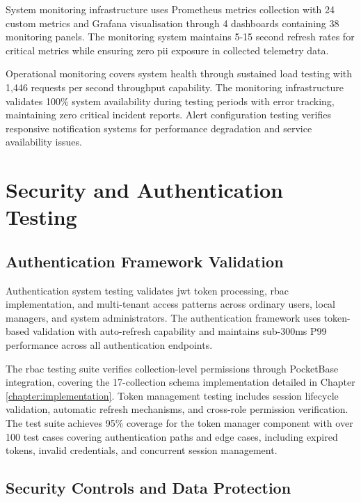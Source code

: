 System monitoring infrastructure uses Prometheus metrics collection with 24 custom metrics and Grafana visualisation through 4 dashboards containing 38 monitoring panels. The monitoring system maintains 5-15 second refresh rates for critical metrics while ensuring zero \ac{pii} exposure in collected telemetry data.

Operational monitoring covers system health through sustained load testing with 1,446 requests per second throughput capability. The monitoring infrastructure validates 100\% system availability during testing periods with error tracking, maintaining zero critical incident reports. Alert configuration testing verifies responsive notification systems for performance degradation and service availability issues.


\section{Security and Authentication Testing} \label{section:security_testing}

\subsection{Authentication Framework Validation} \label{subsection:authentication_validation}

Authentication system testing validates \ac{jwt} token processing, \ac{rbac} implementation, and multi-tenant access patterns across ordinary users, local managers, and system administrators. The authentication framework uses token-based validation with auto-refresh capability and maintains sub-300ms P99 performance across all authentication endpoints.

The \ac{rbac} testing suite verifies collection-level permissions through PocketBase integration, covering the 17-collection schema implementation detailed in Chapter \ref{chapter:implementation}. Token management testing includes session lifecycle validation, automatic refresh mechanisms, and cross-role permission verification. The test suite achieves 95\% coverage for the token manager component with over 100 test cases covering authentication paths and edge cases, including expired tokens, invalid credentials, and concurrent session management.

\subsection{Security Controls and Data Protection} \label{subsection:security_controls}

